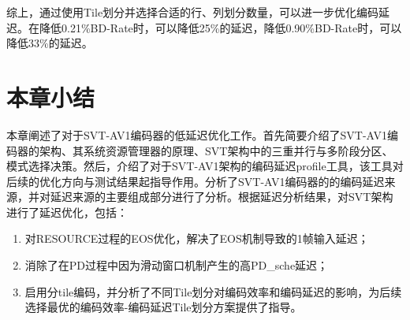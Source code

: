 	综上，通过使用Tile划分并选择合适的行、列划分数量，可以进一步优化编码延迟。在降低0.21\%BD-Rate时，可以降低25\%的延迟，降低0.90\%BD-Rate时，可以降低33\%的延迟。

	\section{本章小结}

	本章阐述了对于SVT-AV1编码器的低延迟优化工作。首先简要介绍了SVT-AV1编码器的架构、其系统资源管理器的原理、SVT架构中的三重并行与多阶段分区、模式选择决策。然后，介绍了对于SVT-AV1架构的编码延迟profile工具，该工具对后续的优化方向与测试结果起指导作用。分析了SVT-AV1编码器的的编码延迟来源，并对延迟来源的主要组成部分进行了分析。根据延迟分析结果，对SVT架构进行了延迟优化，包括：
	\begin{enumerate}[label=\arabic*)]
		\item 对RESOURCE过程的EOS优化，解决了EOS机制导致的1帧输入延迟；
		\item 消除了在PD过程中因为滑动窗口机制产生的高PD\_sche延迟；
		\item 启用分tile编码，并分析了不同Tile划分对编码效率和编码延迟的影响，为后续选择最优的编码效率-编码延迟Tile划分方案提供了指导。
	\end{enumerate}
